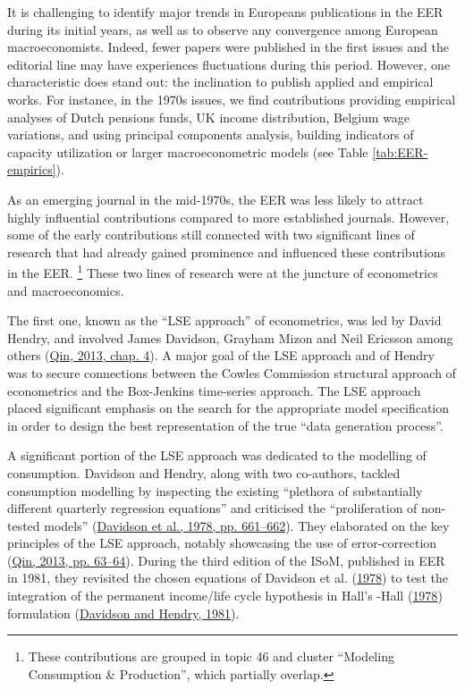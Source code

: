 \documentclass[
  12pt,
  onecolumn]{article}
\begin{document}
It is challenging to identify major trends in Europeans publications in the EER during its initial years, as well as to observe any convergence among European macroeconomists. Indeed, fewer papers were published in the first issues and the editorial line may have experiences fluctuations during this period. However, one characteristic does stand out: the inclination to publish applied and empirical works. For instance, in the 1970s issues, we find contributions providing empirical analyses of Dutch pensions funds, UK income distribution, Belgium wage variations, and using principal components analysis, building indicators of capacity utilization or larger macroeconometric models (see Table \ref{tab:EER-empirics}).

As an emerging journal in the mid-1970s, the EER was less likely to attract highly influential contributions compared to more established journals. However, some of the early contributions still connected with two significant lines of research that had already gained prominence and influenced these contributions in the EER. \footnote{These contributions are grouped in topic 46 and cluster ``Modeling Consumption \& Production'', which partially overlap.} These two lines of research were at the juncture of econometrics and macroeconomics.

The first one, known as the ``LSE approach'' of econometrics, was led by David Hendry, and involved James Davidson, Grayham Mizon and Neil Ericsson among others (\protect\hyperlink{ref-qin2013a}{Qin, 2013, chap. 4}). A major goal of the LSE approach and of Hendry was to secure connections between the Cowles Commission structural approach of econometrics and the Box-Jenkins time-series approach. The LSE approach placed significant emphasis on the search for the appropriate model specification in order to design the best representation of the true ``data generation process''.

A significant portion of the LSE approach was dedicated to the modelling of consumption. Davidson and Hendry, along with two co-authors, tackled consumption modelling by inspecting the existing ``plethora of substantially different quarterly regression equations'' and criticised the ``proliferation of non-tested models'' (\protect\hyperlink{ref-davidson1978}{Davidson et al., 1978, pp. 661--662}). They elaborated on the key principles of the LSE approach, notably showcasing the use of error-correction (\protect\hyperlink{ref-qin2013a}{Qin, 2013, pp. 63--64}). During the third edition of the ISoM, published in EER in 1981, they revisited the chosen equations of Davidson et al. (\protect\hyperlink{ref-davidson1978}{1978}) to test the integration of the permanent income/life cycle hypothesis in Hall's -Hall (\protect\hyperlink{ref-hall1978b}{1978}) formulation (\protect\hyperlink{ref-davidson1981}{Davidson and Hendry, 1981}).
\end{document}
